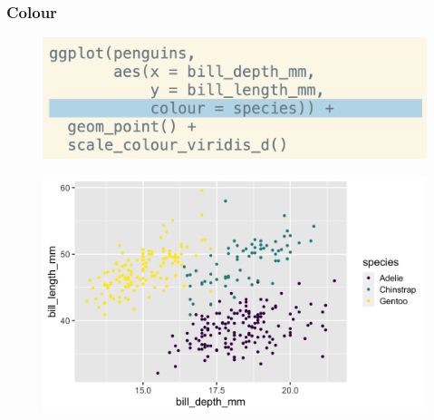 \documentclass[11pt]{beamer}
\begin{document}
\begin{frame}
	\frametitle{\textbf{Colour}}

		\begin{minipage}[t]{0.5\linewidth}
			\begin{figure}
				\centering
				\includegraphics[width=1\linewidth]{Images/S2/code/s18}
				
			\end{figure}
		\end{minipage}%
		\begin{minipage}[t]{0.5\linewidth}
			
			\begin{figure}
				\centering
				\includegraphics[width=1\linewidth]{Images/S2/colour-1}
				
			\end{figure}
			
			
		\end{minipage}
		
	
\end{frame}
\end{document}
